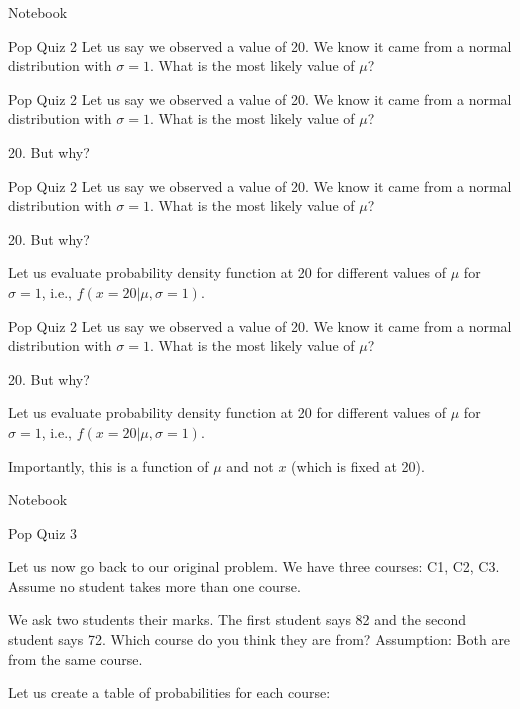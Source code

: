\documentclass{beamer}
\begin{document}
\begin{frame}
  Notebook  
\end{frame}

\begin{frame}{Pop Quiz 2}
    Let us say we observed a value of 20. We know it came from a normal distribution with $\sigma=1$. What is the most likely value of $\mu$?
    


\end{frame}

\begin{frame}{Pop Quiz 2}
    Let us say we observed a value of 20. We know it came from a normal distribution with $\sigma=1$. What is the most likely value of $\mu$?
    
    20. But why?


\end{frame}

\begin{frame}{Pop Quiz 2}
    Let us say we observed a value of 20. We know it came from a normal distribution with $\sigma=1$. What is the most likely value of $\mu$?
    
    20. But why?

    Let us evaluate probability density function at 20 for different values of $\mu$ for $\sigma=1$, i.e., $f(x=20|\mu, \sigma=1)$.


\end{frame}

\begin{frame}{Pop Quiz 2}
    Let us say we observed a value of 20. We know it came from a normal distribution with $\sigma=1$. What is the most likely value of $\mu$?
    
    20. But why?

    Let us evaluate probability density function at 20 for different values of $\mu$ for $\sigma=1$, i.e., $f(x=20|\mu, \sigma=1)$.

    Importantly, this is a function of $\mu$ and not $x$ (which is fixed at 20).

\end{frame}

\begin{frame}
    Notebook
\end{frame}

\begin{frame}{Pop Quiz 3}


Let us now go back to our original problem. We have three courses: C1, C2, C3. Assume no student takes more than one course.

We ask two students their marks. The first student says 82 and the second student says 72. Which course do you think they are from? Assumption: Both are from the same course.

Let us create a table of probabilities for each course:




    
\end{frame}
\end{document}
